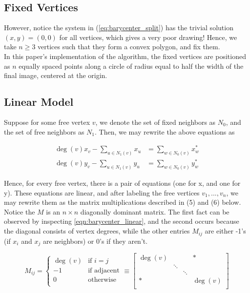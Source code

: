 \documentclass[11pt]{report}
\begin{document}
\subsection{Fixed Vertices}
However, notice the system in (\ref{eq:barycenter_split}) has the trivial solution $(x, y) = (0, 0)$ for all vertices, which gives a very poor drawing! Hence, we take $n \geq 3$ vertices such that they form a convex polygon, and fix them. \\

In this paper's implementation of the algorithm, the fixed vertices are positioned as $n$ equally spaced points along a circle of radius equal to half the width of the final image, centered at the origin.

\subsection{Linear Model}
Suppose for some free vertex $v$, we denote the set of fixed neighbors as $N_0$, and the set of free neighbors as $N_1$. Then, we may rewrite the above equations as

\begin{equation}\label{eqn:barycenter_linear}
    \begin{aligned}
        \deg{(v)}x_v - \sum_{u \in N_1(v)} x_u &= \sum_{w \in N_0(v)} x^*_w \\
        \deg{(v)}y_v - \sum_{u \in N_1(v)} y_u &= \sum_{w \in N_0(v)} y^*_w
    \end{aligned}
\end{equation}

Hence, for every free vertex, there is a pair of equations (one for x, and one for y). These equations are linear, and after labeling the free vertices $v_1, ..., v_n$, we may rewrite them as the matrix multiplications described in (5) and (6) below. Notice the $M$ is an $n \times n$ diagonally dominant matrix. The first fact can be observed by inspecting \ref{eqn:barycenter_linear}, and the second occurs because the diagonal consists of vertex degrees, while the other entries $M_{ij}$ are either -1's (if $x_i$ and $x_j$ are neighbors) or 0's if they aren't.

\begin{equation}\label{eqn:barycenter_matrix}
    M_{ij} = \begin{cases}
    \deg(v) &{\text{if $i = j$}} \\
    -1      &{\text{if adjacent}} \\
    0       &{\text{otherwise}} \\
    \end{cases}
    \equiv
    \begin{bmatrix}
    \deg(v) &        &        & * \\
            & \ddots &        & \\
            &        & \ddots & \\
    *       &        &        & \deg(v) \\
    \end{bmatrix}
\end{equation}
\end{document}
